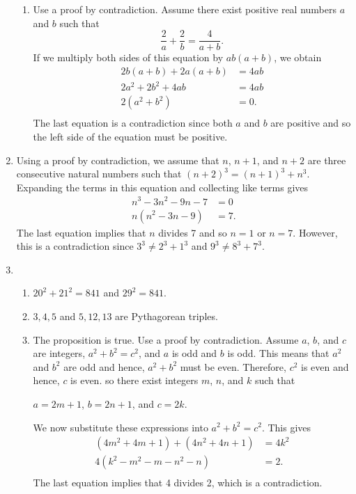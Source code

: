 \begin{enumerate}
\begin{enumerate}
\item Use a proof by contradiction.  Assume there exist positive real numbers $a$ and $b$ such that
\[
\frac{2}{a} + \frac{2}{b} = \frac{4}{a + b}.
\]
If we multiply both sides of this equation by $ab \left( a + b \right)$, we obtain
\[
\begin{aligned}
2b \left( a + b \right) + 2a \left( a + b \right) &= 4ab \\
2a^2 + 2b^2 + 4ab &= 4ab \\
2 \left( a^2 + b^2 \right) &= 0. \\
\end{aligned}
\]
The last equation is a contradiction since both $a$ and $b$ are positive and so the left side of the equation must be positive.
\end{enumerate}


\item Using a proof by contradiction, we assume that $n$, $n + 1$, and $n + 2$ are three consecutive natural numbers such that $(n + 2)^3 = (n + 1)^3 + n^3$.  Expanding the terms in this equation and collecting like terms gives
\begin{align*}
          n^3 - 3n^2 - 9n - 7 &= 0 \\
n \left( n^2 - 3n - 9 \right) &= 7.
\end{align*}
The last equation implies that $n$ divides 7 and so $n = 1$ or $n = 7$.  However, this is a contradiction since $3^3 \ne 2^3 + 1^3$ and $9^3 \ne 8^3 + 7^3$.



\item \begin{enumerate}
\item $20^2 + 21^2 = 841$ and $29^2 = 841$.

\item $3, 4, 5$ and $5, 12, 13$ are Pythagorean triples.

\item The proposition is true.  Use a proof by contradiction.  Assume $a$, $b$, and $c$ are integers, $a^2 + b^2 = c^2$, and $a$ is odd and $b$ is odd.  This means that $a^2$ and $b^2$ are odd and hence, $a^2 + b^2$ must be even.  Therefore, $c^2$ is even and hence, $c$ is even.  so there exist integers $m$, $n$, and $k$ such that
\begin{center}
$a = 2m + 1$, \quad $b = 2n + 1$, \quad and $c = 2k$.
\end{center}
We now substitute these expressions into $a^2 + b^2 = c^2$.  This gives
\[
\begin{aligned}
\left( 4m^2 + 4m + 1 \right) + \left( 4n^2 + 4n + 1 \right) &= 4k^2 \\
4 \left( k^2 - m^2 - m - n^2 - n \right)&= 2. \\
\end{aligned}
\]
The last equation implies that 4 divides 2, which is a contradiction.
\end{enumerate}


\end{enumerate}
